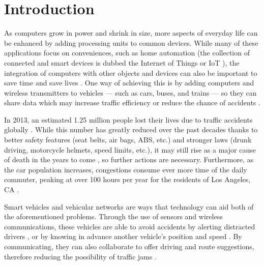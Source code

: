 \chapter{Introduction} 	
\label{chap:introduction}




As computers grow in power and shrink in size, more aspects of everyday life can be enhanced by adding processing units to common devices.
While many of these applications focus on conveniences, such as home automation \cite{mccole2016} (the collection of connected and smart devices is dubbed the Internet of Things or IoT \cite{morgan2014}), the integration of computers with other objects and devices can also be important to save time and save lives \cite{rti2014}.
One way of achieving this is by adding computers and wireless transmitters to vehicles — such as cars, buses, and trains — so they can share data which may increase traffic efficiency or reduce the chance of accidents \cite{saini2015close}.

In 2013, an estimated 1.25 million people lost their lives due to traffic accidents globally \cite{whotraffic}.
While this number has greatly reduced over the past decades \cite{johnson2010traffic} thanks to better safety features (seat belts, air bags, ABS, etc.) and stronger laws (drunk driving, motorcycle helmets, speed limits, etc.), it may still rise as a major cause of death in the years to come \cite{whofactsheet}, so further actions are necessary.
Furthermore, as the car population increases, congestions consume ever more time of the daily commuter, peaking at over 100 hours per year for the residents of Los Angeles, CA \cite{inrixtraffic}.

Smart vehicles and vehicular networks are ways that technology can aid both of the aforementioned problems.
Through the use of sensors and wireless communications, these vehicles are able to avoid accidents by alerting distracted drivers \cite{lee2004collision}, or by knowing in advance another vehicle's position and speed \cite{hafner2011automated}.
By communicating, they can also collaborate to offer driving and route suggestions, therefore reducing the possibility of traffic jams \cite{knorr2012reducing}.

